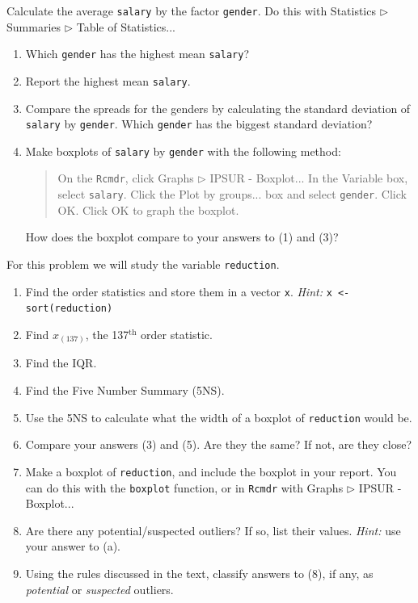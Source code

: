\documentclass[captions=tableheading]{scrbook}
\begin{document}
\begin{xca}
Calculate the average \texttt{salary} by the factor \texttt{gender}. Do this with \textsf{Statistics} \textsf{\(\triangleright\) Summaries} \textsf{\(\triangleright\) Table of Statistics}... 
\begin{enumerate}
\item Which \texttt{gender} has the highest mean \texttt{salary}?
\item Report the highest mean \texttt{salary}.
\item Compare the spreads for the genders by calculating the standard deviation of \texttt{salary} by \texttt{gender}. Which \texttt{gender} has the biggest standard deviation?
\item Make boxplots of \texttt{salary} by \texttt{gender} with the following method:
\begin{quote}
On the \texttt{Rcmdr}, click \textsf{Graphs} \textsf{\(\triangleright\)} \textsf{IPSUR - Boxplot}...
In the \textsf{Variable} box, select \texttt{salary}.
Click the \textsf{Plot by groups}... box and select \texttt{gender}. Click \textsf{OK}.
Click \textsf{OK} to graph the boxplot.
\end{quote}

   How does the boxplot compare to your answers to (1) and (3)?
\end{enumerate}
\end{xca}

\begin{xca}
For this problem we will study the variable \texttt{reduction}.
\begin{enumerate}
\item Find the order statistics and store them in a vector \texttt{x}. \emph{Hint:} \texttt{x <- sort(reduction)}
\item Find \(x_{(137)}\), the 137\(^{\mathrm{th}}\) order statistic.
\item Find the IQR.
\item Find the Five Number Summary (5NS).
\item Use the 5NS to calculate what the width of a boxplot of \texttt{reduction} would be.
\item Compare your answers (3) and (5). Are they the same? If not, are they close?
\item Make a boxplot of \texttt{reduction}, and include the boxplot in your report. You can do this with the \texttt{boxplot} function, or in \texttt{Rcmdr} with \textsf{Graphs} \textsf{\(\triangleright\)} \textsf{IPSUR - Boxplot}...
\item Are there any potential/suspected outliers? If so, list their values. \emph{Hint:} use your answer to (a).
\item Using the rules discussed in the text, classify answers to (8), if any, as \emph{potential} or \emph{suspected} outliers.
\end{enumerate}

\end{xca}
\end{document}
